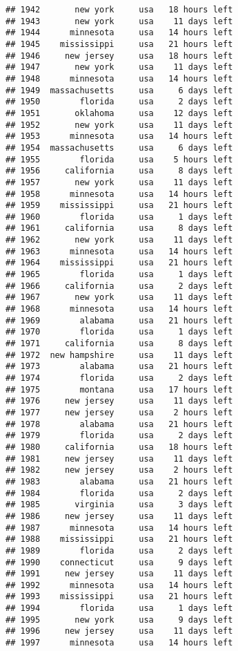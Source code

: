 \documentclass[
]{article}
\begin{document}
\begin{verbatim}
## 1942       new york     usa   18 hours left
## 1943       new york     usa    11 days left
## 1944      minnesota     usa   14 hours left
## 1945    mississippi     usa   21 hours left
## 1946     new jersey     usa   18 hours left
## 1947       new york     usa    11 days left
## 1948      minnesota     usa   14 hours left
## 1949  massachusetts     usa     6 days left
## 1950        florida     usa     2 days left
## 1951       oklahoma     usa    12 days left
## 1952       new york     usa    11 days left
## 1953      minnesota     usa   14 hours left
## 1954  massachusetts     usa     6 days left
## 1955        florida     usa    5 hours left
## 1956     california     usa     8 days left
## 1957       new york     usa    11 days left
## 1958      minnesota     usa   14 hours left
## 1959    mississippi     usa   21 hours left
## 1960        florida     usa     1 days left
## 1961     california     usa     8 days left
## 1962       new york     usa    11 days left
## 1963      minnesota     usa   14 hours left
## 1964    mississippi     usa   21 hours left
## 1965        florida     usa     1 days left
## 1966     california     usa     2 days left
## 1967       new york     usa    11 days left
## 1968      minnesota     usa   14 hours left
## 1969        alabama     usa   21 hours left
## 1970        florida     usa     1 days left
## 1971     california     usa     8 days left
## 1972  new hampshire     usa    11 days left
## 1973        alabama     usa   21 hours left
## 1974        florida     usa     2 days left
## 1975        montana     usa   17 hours left
## 1976     new jersey     usa    11 days left
## 1977     new jersey     usa    2 hours left
## 1978        alabama     usa   21 hours left
## 1979        florida     usa     2 days left
## 1980     california     usa   18 hours left
## 1981     new jersey     usa    11 days left
## 1982     new jersey     usa    2 hours left
## 1983        alabama     usa   21 hours left
## 1984        florida     usa     2 days left
## 1985       virginia     usa     3 days left
## 1986     new jersey     usa    11 days left
## 1987      minnesota     usa   14 hours left
## 1988    mississippi     usa   21 hours left
## 1989        florida     usa     2 days left
## 1990    connecticut     usa     9 days left
## 1991     new jersey     usa    11 days left
## 1992      minnesota     usa   14 hours left
## 1993    mississippi     usa   21 hours left
## 1994        florida     usa     1 days left
## 1995       new york     usa     9 days left
## 1996     new jersey     usa    11 days left
## 1997      minnesota     usa   14 hours left

\end{verbatim}
\end{document}
